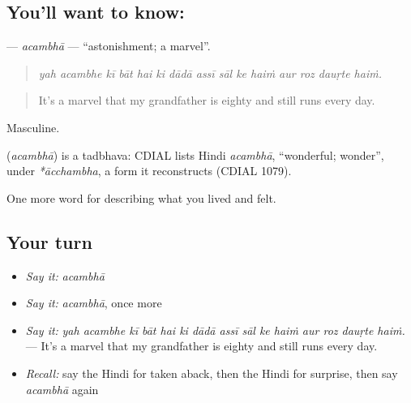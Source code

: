 \subsection*{You'll want to know: }
\textbf{} — \emph{acambhā} — \textquotedblleft{}astonishment; a marvel\textquotedblright{}.

\begin{quote}
              
\end{quote}

\begin{quote}
\emph{yah acambhe kī bāt hai ki dādā assī sāl ke haiṁ aur roz dauṛte haiṁ.}
\end{quote}

\begin{quote}
It's a marvel that my grandfather is eighty and still runs every day.
\end{quote}

Masculine.

\begin{cousinweb}
\textbf{} (\emph{acambhā}) is a tadbhava: CDIAL lists Hindi \emph{acambhā}, \textquotedblleft{}wonderful; wonder\textquotedblright{}, under \emph{*ācchambha}, a form it reconstructs (CDIAL 1079).
\end{cousinweb}

\begin{grammarlens}[title={What you've built}]
One more word for describing what you lived and felt.
\end{grammarlens}

\subsection*{Your turn}
\begin{itemize}
\raggedright
  \item \emph{Say it:} \emph{acambhā}
  \item \emph{Say it:} \emph{acambhā}, once more
  \item \emph{Say it:} \emph{yah acambhe kī bāt hai ki dādā assī sāl ke haiṁ aur roz dauṛte haiṁ.} — It's a marvel that my grandfather is eighty and still runs every day.
  \item \emph{Recall:} say the Hindi for taken aback, then the Hindi for surprise, then say \emph{acambhā} again
\end{itemize}

